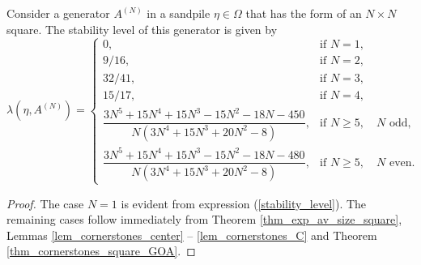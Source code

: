 \documentclass{article}
\begin{document}
\begin{corollary}
    Consider a generator $A^{(N)}$ in a sandpile $\eta \in \Omega$ that has the form of an $N \times N$ square. The stability level of this generator is given by
    \begin{equation*}
        \lambda(\eta, A^{(N)}) = \begin{cases}
            0, &\text{if } N = 1, \\[1.2em]
            9/16, &\text{if } N = 2, \\[1.2em]
            32/41, &\text{if } N = 3, \\[1.2em]
            15/17, &\text{if } N = 4, \\[1.2em]
            \dfrac{3N^5+15N^4+15N^3-15N^2-18N-450}{N(3N^4+15N^3+20N^2-8)}, &\text{if } N \geq 5, \quad N \text{ odd,}\\[1.2em]
            \dfrac{3N^5+15N^4+15N^3-15N^2-18N-480}{N(3N^4+15N^3+20N^2-8)}, &\text{if } N \geq 5, \quad N \text{ even.}
        \end{cases}
    \end{equation*}
\end{corollary}
\begin{proof}
    The case $N = 1$ is evident from expression (\ref{stability_level}). The remaining cases follow immediately from Theorem \ref{thm_exp_av_size_square}, Lemmas \ref{lem_cornerstones_center} -- \ref{lem_cornerstones_C} and Theorem \ref{thm_cornerstones_square_GOA}.
\end{proof}
\end{document}
